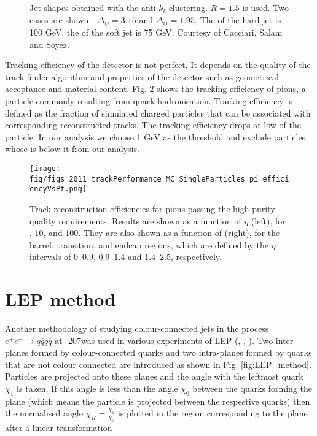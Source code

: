 \begin{figure}[hbtp]
  \def\twidth{0.5}
   \caption{Jet shapes obtained with the anti-$k_{t}$ clustering. $R=1.5$ is used. Two cases are shown - $\Delta_{ij}=3.15$ and  $\Delta_{ij}=1.95$. The \pt of the hard jet is 100 GeV, the \pt of the soft jet is 75 GeV. Courtesy of Cacciari, Salam and Soyez.}
  \label{fig:anti_kt}
\end{figure}

Tracking efficiency of the detector is not perfect. It depends on the quality of the track finder algorithm and properties of the detector such as geometrical acceptance and material content. Fig. \ref{fig:2011_trackPerformance_MC_SingleParticles_pi_efficiencyVsPt}  shows the tracking efficiency of pions, a particle commonly resulting from quark hadronisation. Tracking efficiency is defined as the fraction of simulated charged particles that can be associated with corresponding reconstructed tracks. The tracking efficiency drops at low \pt of the particle. In our analysis we choose 1 GeV as the threshold and exclude particles whose \pt is below it from our analysis.

\begin{figure}[hbtp]
    \texttt{[image: fig/figs\_2011\_trackPerformance\_MC\_SingleParticles\_pi\_efficiencyVsPt.png]}
    \caption{Track reconstruction efficiencies for pions passing the high-purity quality requirements. Results are shown as a function of $\eta$ (left), for , 10, and 100\GeV. They are also shown as a function of \pt (right), for the barrel, transition, and endcap regions, which are defined by the $\eta$ intervals of 0--0.9, 0.9--1.4 and 1.4--2.5, respectively. \cite{Chatrchyan:2014fea}}
    \label{fig:2011_trackPerformance_MC_SingleParticles_pi_efficiencyVsPt}
\end{figure}

\section{LEP method}

Another methodology of studying colour-connected jets in the process $e^{+}e^{-}\rightarrow q\overline{q}q\overline{q}$ at -207\GeV was used in various experiments of LEP (\cite{Abdallah:2006uq}, \cite{Abbiendi:2005es}, \cite{Achard:2003pe}). Two inter-\PW planes formed by colour-connected quarks and two intra-\PW planes formed by quarks that are not colour connected are introduced as shown in Fig. \ref{fig:LEP_method}. Particles are projected onto these planes and the angle with the leftmost quark $\chi_{1}$ is taken. If this angle is less than the angle $\chi_{0}$ between the quarks forming the plane (which means the particle is projected between the respestive quarks) then the normalised angle $\chi_{R}=\frac{\chi_{1}}{\chi_{0}}$ is plotted in the region corresponding to the plane after a linear transformation

